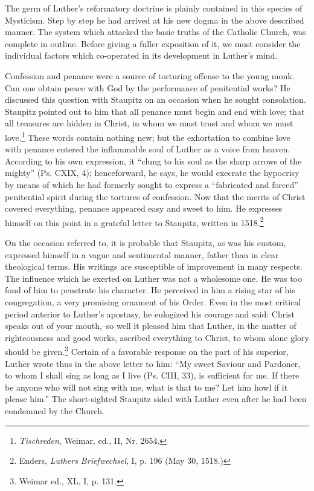 The germ of Luther’s reformatory doctrine is plainly contained
in this species of Mysticism. Step by step he had arrived at his new
dogma in the above described manner. The system which attacked
the basic truths of the Catholic Church, was complete in outline.
Before giving a fuller exposition of it, we must consider the individual
factors which co-operated in its development in Luther’s mind.

Confession and penance were a source of torturing offense to the
young monk. Can one obtain peace with God by the performance
of penitential works? He discussed this question with Staupitz on an
occasion when he sought consolation. Staupitz pointed out to him that
all penance must begin and end with love; that all treasures are
hidden in Christ, in whom we must trust and whom we must love.\footnote
{\textit{Tischreden}, Weimar, ed., II, Nr. 2654.}
These words contain nothing new; but the exhortation to combine
love with penance entered the inflammable soul of Luther as a voice
from heaven. According to his own expression, it “clung to his soul
as the sharp arrows of the mighty” (Ps. CXIX, 4); henceforward,
he says, he would execrate the hypocrisy by means of which he had
formerly sought to express a “fabricated and forced” penitential
spirit during the tortures of confession. Now that the merits
of Christ covered everything, penance appeared easy and sweet
to him. He expresses himself on this point in a grateful letter to
Staupitz, written in 1518.\footnote
{Enders, \textit{Luthers Briefwechsel}, I, p. 196 (May 30, 1518.)}

On the occasion referred to, it is probable that Staupitz, as was
his custom, expressed himself in a vague and sentimental manner,
father than in clear theological terms. His writings are susceptible of
improvement in many respects. The influence which he exerted on
Luther was not a wholesome one. He was too fond of him to penetrate
his character. He perceived in him a rising star of his congregation,
a very promising ornament of his Order. Even in the most
critical period anterior to Luther’s apostasy, he eulogized his courage
and said: Christ speaks out of your mouth,--so well it pleased him
that Luther, in the matter of righteousness and good works, ascribed
everything to Christ, to whom alone glory should be given.\footnote{Weimar ed., XL, I, p. 131.}
Certain of a favorable response on the part of his superior, Luther wrote thus
in the above letter to him: “My sweet Saviour and Pardoner, to whom I
shall sing as long as I live (Ps. CIII, 33), is sufficient for me. If there
be anyone who will not sing with me, what is that to me? Let him
howl if it please him.” The short-sighted Staupitz sided with Luther
even after he had been condemned by the Church.


